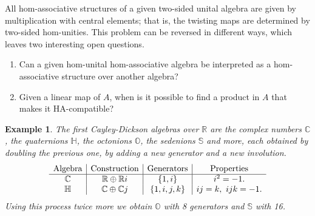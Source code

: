 \documentclass[12pt]{article}
\newtheorem{example}[theorem]{Example}
\begin{document}
		
		All hom-associative structures of a given two-sided unital algebra are given by multiplication with central elements; that is, the twisting maps are determined by two-sided hom-unities. This problem can be reversed in different ways, which leaves two interesting open questions.
		\begin{enumerate}
			\item Can a given hom-unital hom-associative algebra be interpreted as a hom-assoc\-iative structure over another algebra?
			\item Given a linear map of $A$, when is it possible to find a product in $A$ that makes it HA-compatible?
		\end{enumerate}
		
		\begin{example}
			The first Cayley-Dickson algebras over $\mathbb{R}$ are the complex numbers $\mathbb{C}$, the quaternions $\mathbb{H}$, the octonions $\mathbb{O}$, the sedenions $\mathbb{S}$ and more, each obtained by \textit{doubling} the previous one, by adding a new generator and a new involution.
			\begin{equation*}
				\begin{array}{c|c|c|c}
					\textnormal{Algebra} & \textnormal{Construction} & \textnormal{Generators} & \textnormal{Properties}\\
					\hline
					\mathbb{C} & \mathbb{R}\oplus\mathbb{R}i & \{1,i\} & i^2=-1.\\
					\mathbb{H} & \mathbb{C}\oplus\mathbb{C}j & \{1,i,j,k\} & ij=k,\ ijk=-1.
				\end{array}
			\end{equation*}
			Using this process twice more we obtain $\mathbb{O}$ with 8 generators and $\mathbb{S}$ with 16.
			

\end{example}
\end{document}
